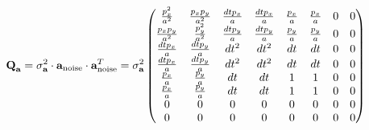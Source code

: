 \documentclass{article}
\begin{document}
\begin{equation}
  \textbf{Q}_{\textbf{a}} = \sigma^2_{\textbf{a}} \cdot \textbf{a}_{\textrm{noise}} \cdot \textbf{a}_{\textrm{noise}}^T \\
  = \sigma^2_{\textbf{a}} \left(\begin{matrix}\frac{p_{x}^{2}}{a^{2}} & \frac{p_{x} p_{y}}{a^{2}} & \frac{dt p_{x}}{a} & \frac{dt p_{x}}{a} & \frac{p_{x}}{a} & \frac{p_{x}}{a} & 0 & 0\\\frac{p_{x} p_{y}}{a^{2}} & \frac{p_{y}^{2}}{a^{2}} & \frac{dt p_{y}}{a} & \frac{dt p_{y}}{a} & \frac{p_{y}}{a} & \frac{p_{y}}{a} & 0 & 0\\\frac{dt p_{x}}{a} & \frac{dt p_{y}}{a} & dt^{2} & dt^{2} & dt & dt & 0 & 0\\\frac{dt p_{x}}{a} & \frac{dt p_{y}}{a} & dt^{2} & dt^{2} & dt & dt & 0 & 0\\\frac{p_{x}}{a} & \frac{p_{y}}{a} & dt & dt & 1 & 1 & 0 & 0\\\frac{p_{x}}{a} & \frac{p_{y}}{a} & dt & dt & 1 & 1 & 0 & 0\\0 & 0 & 0 & 0 & 0 & 0 & 0 & 0\\0 & 0 & 0 & 0 & 0 & 0 & 0 & 0\end{matrix}\right)
\end{equation}
\end{document}
